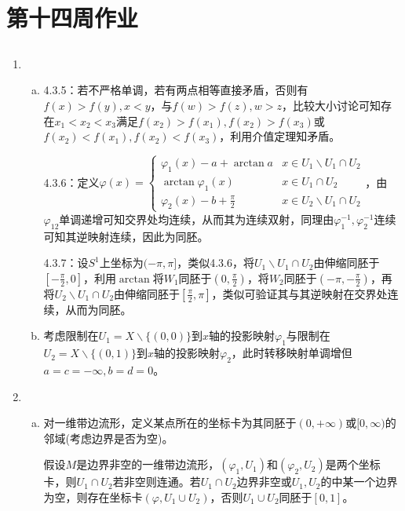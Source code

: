 \documentclass[a4paper,UTF8,fontset=windows]{ctexart}
\begin{document}
\section{第十四周作业}
\subsection{}
\begin{enumerate}[(1)]
    \item
    \begin{enumerate}[(a)]
    \item
    4.3.5：若不严格单调，若有两点相等直接矛盾，否则有$f(x)>f(y),x<y$，与$f(w)>f(z),w>z$，比较大小讨论可知存在$x_1<x_2<x_3$满足$f(x_2)>f(x_1),f(x_2)>f(x_3)$或$f(x_2)<f(x_1),f(x_2)<f(x_3)$，利用介值定理知矛盾。
    
    4.3.6：定义$\varphi(x)=\begin{cases}\varphi_1(x)-a+\arctan{a}&x\in U_1\backslash U_1\cap U_2\\\arctan\varphi_1(x)&x\in U_1\cap U_2\\\varphi_2(x)-b+\frac{\pi}{2}&x\in U_2\backslash U_1\cap U_2\end{cases}$，由$\varphi_{12}$单调递增可知交界处均连续，从而其为连续双射，同理由$\varphi_1^{-1},\varphi_2^{-1}$连续可知其逆映射连续，因此为同胚。
    
    4.3.7：设$S^1$上坐标为$(-\pi,\pi]$，类似4.3.6，将$U_1\backslash U_1\cap U_2$由伸缩同胚于$[-\frac{\pi}{2},0]$，利用$\arctan$将$W_1$同胚于$(0,\frac{\pi}{2})$，将$W_2$同胚于$(-\pi,-\frac{\pi}{2})$，再将$U_2\backslash U_1\cap U_2$由伸缩同胚于$[\frac{\pi}{2},\pi]$，类似可验证其与其逆映射在交界处连续，从而为同胚。
    
    \item
    考虑限制在$U_1=X\backslash\{(0,0)\}$到$x$轴的投影映射$\varphi_1$与限制在$U_2=X\backslash\{(0,1)\}$到$x$轴的投影映射$\varphi_2$，此时转移映射单调增但$a=c=-\infty,b=d=0$。
    \end{enumerate}
    
    \item
    \begin{enumerate}[(a)]
    \item
    对一维带边流形，定义某点所在的坐标卡为其同胚于$(0,+\infty)$或$[0,\infty)$的邻域(考虑边界是否为空)。
    
    假设$M$是边界非空的一维带边流形，$(\varphi_1,U_1)$和$(\varphi_2,U_2)$是两个坐标卡，则$U_1\cap U_2$若非空则连通。若$U_1\cap U_2$边界非空或$U_1,U_2$的中某一个边界为空，则存在坐标卡$(\varphi,U_1\cup U_2)$，否则$U_1\cup U_2$同胚于$[0,1]$。
    

\end{enumerate}
\end{enumerate}
\end{document}
